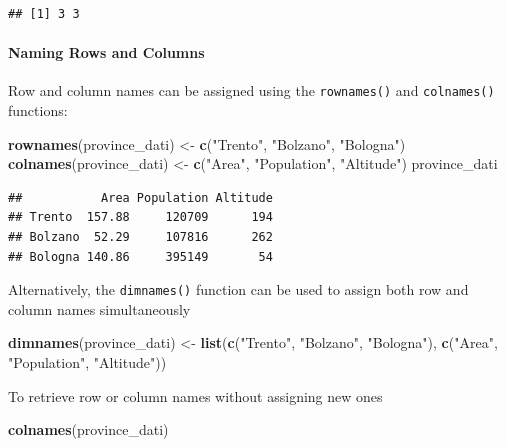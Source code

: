 \documentclass[
]{article}
\newenvironment{Shaded}{\begin{snugshade}}{\end{snugshade}}
\newcommand{\FunctionTok}[1]{\textcolor[rgb]{0.13,0.29,0.53}{\textbf{#1}}}
\newcommand{\NormalTok}[1]{#1}
\newcommand{\OtherTok}[1]{\textcolor[rgb]{0.56,0.35,0.01}{#1}}
\newcommand{\StringTok}[1]{\textcolor[rgb]{0.31,0.60,0.02}{#1}}
\begin{document}
\begin{verbatim}
## [1] 3 3
\end{verbatim}

\hypertarget{naming-rows-and-columns}{%
\paragraph{Naming Rows and Columns}\label{naming-rows-and-columns}}

Row and column names can be assigned using the \texttt{rownames()} and
\texttt{colnames()} functions:

\begin{Shaded}
\begin{Highlighting}[]
\FunctionTok{rownames}\NormalTok{(province\_dati) }\OtherTok{\textless{}{-}} \FunctionTok{c}\NormalTok{(}\StringTok{"Trento"}\NormalTok{, }\StringTok{"Bolzano"}\NormalTok{, }\StringTok{"Bologna"}\NormalTok{)}
\FunctionTok{colnames}\NormalTok{(province\_dati) }\OtherTok{\textless{}{-}} \FunctionTok{c}\NormalTok{(}\StringTok{"Area"}\NormalTok{, }\StringTok{"Population"}\NormalTok{, }\StringTok{"Altitude"}\NormalTok{)}
\NormalTok{province\_dati}
\end{Highlighting}
\end{Shaded}

\begin{verbatim}
##           Area Population Altitude
## Trento  157.88     120709      194
## Bolzano  52.29     107816      262
## Bologna 140.86     395149       54
\end{verbatim}

Alternatively, the \texttt{dimnames()} function can be used to assign
both row and column names simultaneously

\begin{Shaded}
\begin{Highlighting}[]
\FunctionTok{dimnames}\NormalTok{(province\_dati) }\OtherTok{\textless{}{-}} \FunctionTok{list}\NormalTok{(}\FunctionTok{c}\NormalTok{(}\StringTok{"Trento"}\NormalTok{, }\StringTok{"Bolzano"}\NormalTok{, }\StringTok{"Bologna"}\NormalTok{), }
                                  \FunctionTok{c}\NormalTok{(}\StringTok{"Area"}\NormalTok{, }\StringTok{"Population"}\NormalTok{, }\StringTok{"Altitude"}\NormalTok{))}
\end{Highlighting}
\end{Shaded}

To retrieve row or column names without assigning new ones

\begin{Shaded}
\begin{Highlighting}[]
\FunctionTok{colnames}\NormalTok{(province\_dati)}
\end{Highlighting}
\end{Shaded}
\end{document}
